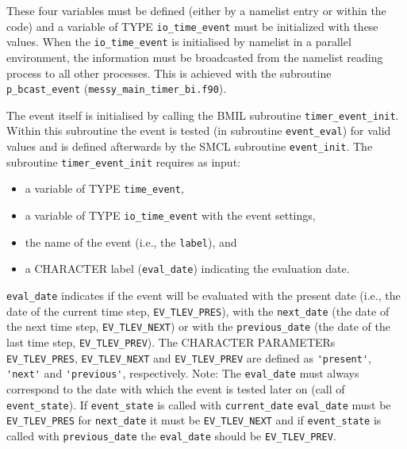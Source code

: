 \documentclass[twoside]{article}
\begin{document}
These four variables must be defined (either by a namelist entry or
within the code) and a variable of {\footnotesize TYPE} \verb|io_time_event| must be 
initialized with these values. When the \verb|io_time_event| is initialised by 
namelist in a parallel environment, the information must be broadcasted from 
the namelist reading process to all other processes. This is achieved with
the subroutine \verb|p_bcast_event| ({\tt messy\_main\_timer\_bi.f90}).

The event itself is initialised by calling the BMIL subroutine 
\verb|timer_event_init|. Within this subroutine the event is tested (in
 subroutine \verb|event_eval|) for valid values and is defined afterwards
 by the SMCL subroutine \verb|event_init|.
The subroutine \verb|timer_event_init| requires as input:
%
\begin{itemize}
\item a variable of {\footnotesize TYPE} \verb|time_event|,
\item a variable of {\footnotesize TYPE} \verb|io_time_event| with the event
      settings,
\item the name of the event (i.e., the \verb|label|), and
\item a {\footnotesize CHARACTER} label (\verb|eval_date|) 
      indicating the evaluation date.
\end{itemize}
%
\verb|eval_date| indicates if the event will be evaluated with the present
date (i.e., the date of the current time step, \verb|EV_TLEV_PRES|), with the
\verb|next_date| (the date of the next time step, \verb|EV_TLEV_NEXT|) or with
the \verb|previous_date| (the date of the last time step, \verb|EV_TLEV_PREV|). 
%
The {\footnotesize CHARACTER PARAMETER}s \verb|EV_TLEV_PRES|, \verb|EV_TLEV_NEXT|
 and \verb|EV_TLEV_PREV|  are defined as \verb|'present'|, \verb|'next'| and
 \verb|'previous'|, respectively.
 Note: The \verb|eval_date| must always correspond to the 
date with which the event is tested later on (call of  \verb|event_state|).
If \verb|event_state| is called with  \verb|current_date|  \verb|eval_date| must
be \verb|EV_TLEV_PRES| for \verb|next_date| it must be \verb|EV_TLEV_NEXT| and 
if \verb|event_state| is called with  \verb|previous_date| the \verb|eval_date|
should be  \verb|EV_TLEV_PREV|.

\end{document}
